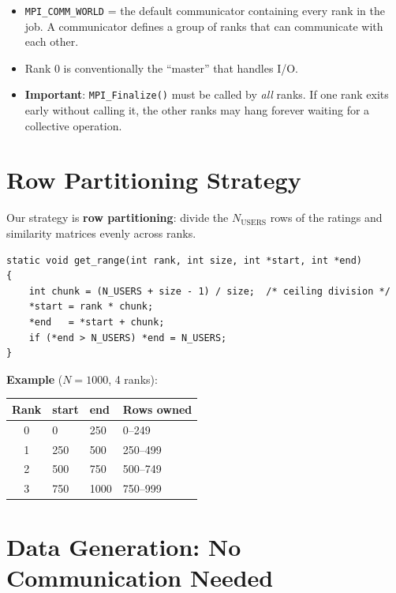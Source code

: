 \documentclass[12pt,a4paper]{article}
\begin{document}
\begin{itemize}
    \item \texttt{MPI\_COMM\_WORLD} = the default communicator containing
          every rank in the job.  A communicator defines a group of ranks
          that can communicate with each other.
    \item Rank 0 is conventionally the ``master'' that handles I/O.
    \item \textbf{Important}: \texttt{MPI\_Finalize()} must be called by
          \emph{all} ranks.  If one rank exits early without calling it, the
          other ranks may hang forever waiting for a collective operation.
\end{itemize}

\section{Row Partitioning Strategy}

Our strategy is \textbf{row partitioning}: divide the $N_{\text{USERS}}$ rows
of the ratings and similarity matrices evenly across ranks.

\begin{lstlisting}
static void get_range(int rank, int size, int *start, int *end)
{
    int chunk = (N_USERS + size - 1) / size;  /* ceiling division */
    *start = rank * chunk;
    *end   = *start + chunk;
    if (*end > N_USERS) *end = N_USERS;
}
\end{lstlisting}

\textbf{Example} ($N = 1000$, 4 ranks):
\begin{center}
\begin{tabular}{clll}
\toprule
Rank & start & end & Rows owned \\
\midrule
0 & 0   & 250 & 0--249 \\
1 & 250 & 500 & 250--499 \\
2 & 500 & 750 & 500--749 \\
3 & 750 & 1000 & 750--999 \\
\bottomrule
\end{tabular}
\end{center}

\section{Data Generation: No Communication Needed}
\end{document}
